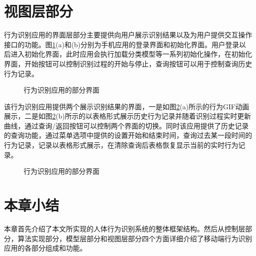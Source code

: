 \section{视图层部分}
\par 行为识别应用的界面层部分主要提供向用户展示识别结果以及为用户提供交互操作接口的功能。图\ref{screenshot1}(a)和(b)分别为手机应用的登录界面和初始化界面。用户登录以后进入初始化界面，此时应用会执行加载分类模型等一系列初始化操作，在初始化界面，开始按钮可以控制识别过程的开始与停止，查询按钮可以用于控制查询历史行为记录。
\begin{figure}[htb]
    \centering
    \caption{行为识别应用的部分界面}\label{screenshot1}
\end{figure}
\par 该行为识别应用提供两个展示识别结果的界面，一是如图\ref{screenshot2}(a)所示的行为GIF动画展示，二是如图\ref{screenshot2}(b)所示的以表格形式展示历史行为记录并随着识别过程实时更新曲线，通过查询/返回按钮可以控制两个界面的切换。同时该应用提供了历史记录的查询功能，通过菜单选项中提供的设置开始和结束时间，查询过去某一段时间的行为记录，记录以表格形式展示，在清除查询后表格恢复显示当前的实时行为记录。
\begin{figure}[htb]
    \centering
    \caption{行为识别应用的部分界面}\label{screenshot2}
\end{figure}
\section{本章小结}
\par 本章首先介绍了本文所实现的人体行为识别系统的整体框架结构。然后从控制层部分，算法实现部分，模型层部分和视图层部分四个方面详细介绍了移动端行为识别应用的各部分组成和功能。
